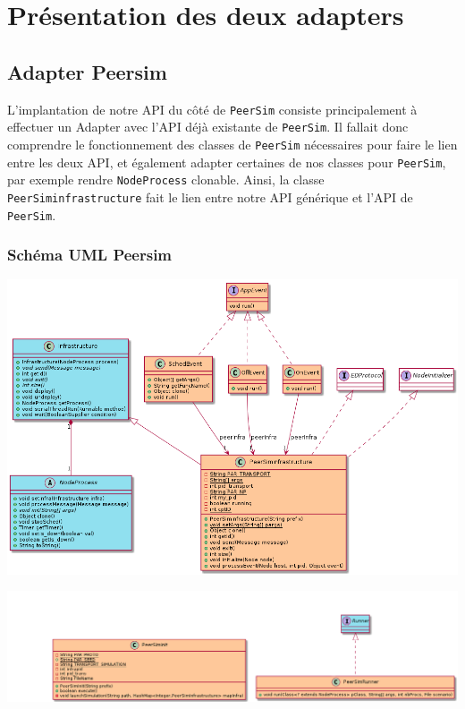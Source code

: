 \documentclass{article}
\begin{document}
				\section{Présentation des deux adapters}
				
				\subsection{Adapter Peersim}
				L'implantation de notre API du côté de \verb|PeerSim| consiste principalement à effectuer un Adapter avec l'API déjà existante de \verb|PeerSim|. Il fallait donc comprendre le fonctionnement des classes de \verb|PeerSim| nécessaires pour faire le lien entre les deux API,  
				et également adapter certaines de nos classes pour \verb|PeerSim|, par exemple rendre \verb|NodeProcess| clonable. 
				\newline
				Ainsi, la classe \verb|PeerSiminfrastructure| fait le lien entre notre API générique et l'API de \verb|PeerSim|.
					\subsubsection{Schéma UML Peersim}
					\hspace*{-1.3cm} \includegraphics[width=17cm]{uml/peersim1.png}

					\hspace*{-3.2cm} \includegraphics[width=20cm]{uml/peersim2.png}
\end{document}
